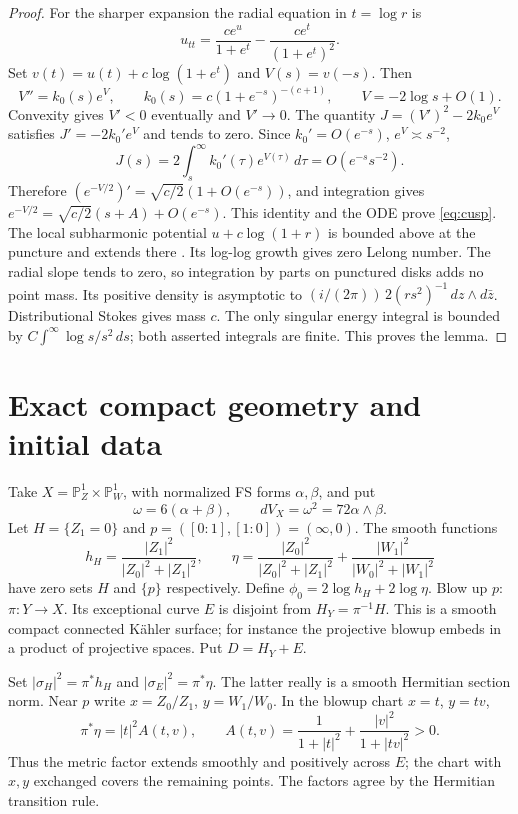 \documentclass[11pt]{article}
\newcommand{\CP}{\mathbb P}
\begin{document}
\begin{proof}
For the sharper expansion the radial equation in $t=\log r$ is
\[
 u_{tt}=\frac{ce^u}{1+e^t}-\frac{ce^t}{(1+e^t)^2}.
\]
Set $v(t)=u(t)+c\log(1+e^t)$ and $V(s)=v(-s)$.
Then
\[
 V''=k_0(s)e^V,\qquad k_0(s)=c(1+e^{-s})^{-(c+1)},
 \qquad V=-2\log s+O(1).
\]
Convexity gives $V'<0$ eventually and $V'\to0$.
The quantity $J=(V')^2-2k_0e^V$ satisfies
$J'=-2k_0'e^V$ and tends to zero. Since
$k_0'=O(e^{-s})$, $e^V\asymp s^{-2}$,
\[
 J(s)=2\int_s^\infty k_0'(\tau)e^{V(\tau)}\,d\tau
                         =O(e^{-s}s^{-2}).
\]
Therefore $(e^{-V/2})'=\sqrt{c/2}(1+O(e^{-s}))$,
and integration gives
$e^{-V/2}=\sqrt{c/2}(s+A)+O(e^{-s})$.
This identity and the ODE prove \eqref{eq:cusp}.
The local subharmonic potential $u+c\log(1+r)$ is bounded above
at the puncture and extends there \cite[Proposition 3.3.25]{JP}.
Its log-log growth gives zero Lelong number. The radial slope tends to
zero, so integration by parts on punctured disks adds no point mass.
Its positive density is asymptotic to
$(i/(2\pi))\,2(r s^2)^{-1}\,dz\wedge d\bar z$.
Distributional Stokes gives mass $c$. The only singular energy integral
is bounded by $C\int^\infty\log s/s^2\,ds$; both asserted integrals
are finite. This proves the lemma.
\end{proof}

\section{Exact compact geometry and initial data}
Take $X=\CP^1_Z\times\CP^1_W$, with normalized FS forms
$\alpha,\beta$, and put
\[
 \omega=6(\alpha+\beta),\qquad dV_X=\omega^2=72\alpha\wedge\beta.
\]
Let $H=\{Z_1=0\}$ and $p=([0:1],[1:0])=(\infty,0)$.
The smooth functions
\[
 h_H=\frac{|Z_1|^2}{|Z_0|^2+|Z_1|^2},\qquad
 \eta=\frac{|Z_0|^2}{|Z_0|^2+|Z_1|^2}
                 +\frac{|W_1|^2}{|W_0|^2+|W_1|^2}
\]
have zero sets $H$ and $\{p\}$ respectively. Define
$\phi_0=2\log h_H+2\log\eta$.
Blow up $p$: $\pi:Y\to X$. Its exceptional curve $E$ is disjoint
from $H_Y=\pi^{-1}H$. This is a smooth compact connected K\"ahler
surface; for instance the projective blowup embeds in a product of
projective spaces. Put $D=H_Y+E$.

Set $|\sigma_H|^2=\pi^*h_H$ and $|\sigma_E|^2=\pi^*\eta$.
The latter really is a smooth Hermitian section norm. Near $p$ write
$x=Z_0/Z_1$, $y=W_1/W_0$. In the blowup chart $x=t$, $y=tv$,
\[
 \pi^*\eta=|t|^2A(t,v),\qquad
 A(t,v)=\frac1{1+|t|^2}+\frac{|v|^2}{1+|tv|^2}>0.
\]
Thus the metric factor extends smoothly and positively across $E$;
the chart with $x,y$ exchanged covers the remaining points.
The factors agree by the Hermitian transition rule.
\end{document}

